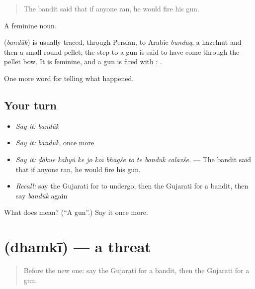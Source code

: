 \begin{quote}
The bandit said that if anyone ran, he would fire his gun.
\end{quote}

A feminine noun.

\begin{cousinweb}
\textbf{} (\emph{bandūk}) is usually traced, through Persian, to Arabic \emph{bunduq}, a hazelnut and then a small round pellet; the step to a gun is said to have come through the pellet bow. It is feminine, and a gun is fired with \textbf{}: \textbf{ }.
\end{cousinweb}

\begin{grammarlens}[title={What you've built}]
One more word for telling what happened.
\end{grammarlens}

\subsection*{Your turn}
\begin{itemize}
\raggedright
  \item \emph{Say it:} \emph{bandūk}
  \item \emph{Say it:} \emph{bandūk}, once more
  \item \emph{Say it:} \emph{ḍākue kahyũ ke jo koī bhāgśe to te bandūk calāvśe.} — The bandit said that if anyone ran, he would fire his gun.
  \item \emph{Recall:} say the Gujarati for to undergo, then the Gujarati for a bandit, then say \emph{bandūk} again
\end{itemize}

\begin{tcolorbox}[breakable,colback=teal!4,colframe=teal!35!black,title={Before you move on}]
What does  mean? (\textquotedblleft{}A gun\textquotedblright{}.) Say it once more.
\end{tcolorbox}
\section[\texorpdfstring{\gu{ધમકી} (dhamkī)}{ધમકી (dhamkī)}]{ (dhamkī) — a threat}

\label{lesson:GU-C290-dhamki}



\begin{quote}
Before the new one: say the Gujarati for a bandit, then the Gujarati for a gun.
\end{quote}


